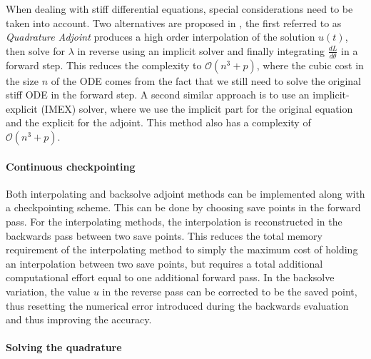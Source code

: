 When dealing with stiff differential equations, special considerations need to be taken into account.
Two alternatives are proposed in \cite{kim_stiff_2021}, the first referred to as \textit{Quadrature Adjoint} produces a high order interpolation of the solution $u(t)$, then solve for $\lambda$ in reverse using an implicit solver and finally integrating $\frac{dL}{d\theta}$ in a forward step.
This reduces the complexity to $\mathcal O (n^3 + p)$, where the cubic cost in the size $n$ of the ODE comes from the fact that we still need to solve the original stiff ODE in the forward step. 
A second similar approach is to use an implicit-explicit (IMEX) solver, where we use the implicit part for the original equation and the explicit for the adjoint. 
This method also has a complexity of $\mathcal O (n^3 + p)$. 

\paragraph{Continuous checkpointing}
\label{section:checkpointint-cont}

Both interpolating and backsolve adjoint methods can be implemented along with a checkpointing scheme. 
This can be done by choosing save points in the forward pass. 
For the interpolating methods, the interpolation is reconstructed in the backwards pass between two save points. 
This reduces the total memory requirement of the interpolating method to simply the maximum cost of holding an interpolation between two save points, but requires a total additional computational effort equal to one additional forward pass. 
In the backsolve variation, the value $u$ in the reverse pass can be corrected to be the saved point, thus resetting the numerical error introduced during the backwards evaluation and thus improving the accuracy.

\paragraph{Solving the quadrature}

